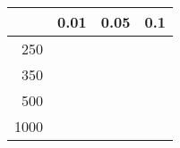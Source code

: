 % 
\begin{tabular}{rrrr}
  \hline
 & 0.01 & 0.05 & 0.1 \\ 
  \hline
250 &  &  &  \\ 
  350 &  &  &  \\ 
  500 &  &  &  \\ 
  1000 &  &  &  \\ 
   \hline
\end{tabular}

